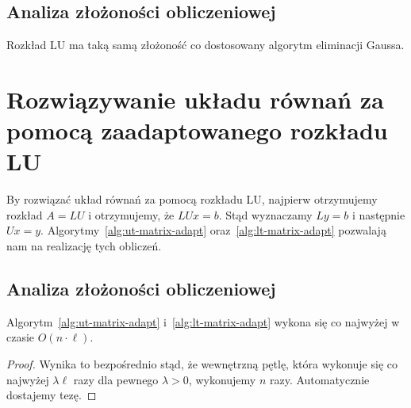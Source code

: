 \documentclass[../main.tex]{subfiles}
\begin{document}
  \subsection{Analiza złożoności obliczeniowej}
  Rozkład LU ma taką samą złożoność co dostosowany algorytm eliminacji Gaussa.

  \section{Rozwiązywanie układu równań za pomocą zaadaptowanego rozkładu LU}
  By rozwiązać układ równań za pomocą rozkładu LU, najpierw
  otrzymujemy rozkład \( A = LU \) i otrzymujemy,
  że \( LUx = b \). Stąd wyznaczamy \( Ly = b \) 
  i następnie \( Ux = y \). Algorytmy~\ref{alg:ut-matrix-adapt}
  oraz~\ref{alg:lt-matrix-adapt} pozwalają nam na realizację
  tych obliczeń.

  \subsection{Analiza złożoności obliczeniowej}

  \begin{fact} %
    Algorytm~\ref{alg:ut-matrix-adapt} i~\ref{alg:lt-matrix-adapt} wykona się
    co najwyżej w czasie \( O(n \cdot \ell) \).
  \end{fact}
  \begin{proof}
    Wynika to bezpośrednio stąd, że wewnętrzną pętlę, która wykonuje się
    co najwyżej \( \lambda \ell \) razy dla pewnego \( \lambda > 0 \), wykonujemy
    \( n \) razy. Automatycznie dostajemy tezę.
  \end{proof}
\end{document}
